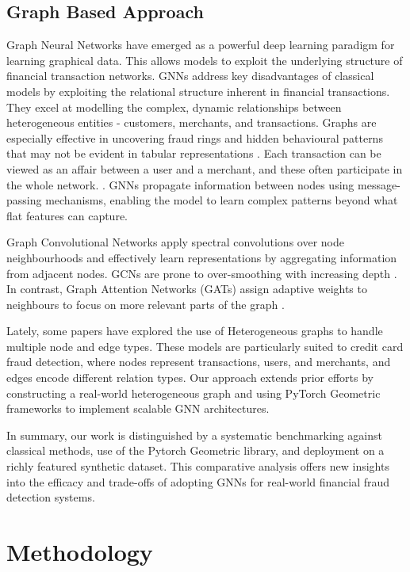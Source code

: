 \documentclass[conference]{IEEEtran}
\begin{document}
\subsection{Graph Based Approach}

Graph Neural Networks have emerged as a powerful deep learning paradigm for learning graphical data. This allows models to exploit the underlying structure of financial transaction networks. GNNs address key disadvantages of classical models by exploiting the relational structure inherent in financial transactions. They excel at modelling the complex, dynamic relationships between heterogeneous entities - customers, merchants, and transactions. Graphs are especially effective in uncovering fraud rings and hidden behavioural patterns that may not be evident in tabular representations \cite{cheng2025gnnreview}. Each transaction can be viewed as an affair between a user and a merchant, and these often participate in the whole network. \cite{IEEE9667674}. GNNs propagate information between nodes using message-passing mechanisms, enabling the model to learn complex patterns beyond what flat features can capture.

Graph Convolutional Networks apply spectral convolutions over node neighbourhoods and effectively learn representations by aggregating information from adjacent nodes. GCNs are prone to over-smoothing with increasing depth \cite{cheng2025gnnreview}. In contrast, Graph Attention Networks (GATs) assign adaptive weights to neighbours to focus on more relevant parts of the graph \cite{IEEE9906987}.

Lately, some papers have explored the use of Heterogeneous graphs to handle multiple node and edge types. These models are particularly suited to credit card fraud detection, where nodes represent transactions, users, and merchants, and edges encode different relation types. Our approach extends prior efforts by constructing a real-world heterogeneous graph and using PyTorch Geometric frameworks to implement scalable GNN architectures.

In summary, our work is distinguished by a systematic benchmarking against classical methods, use of the Pytorch Geometric library, and deployment on a richly featured synthetic dataset. This comparative analysis offers new insights into the efficacy and trade-offs of adopting GNNs for real-world financial fraud detection systems.



\section{Methodology}
\end{document}
